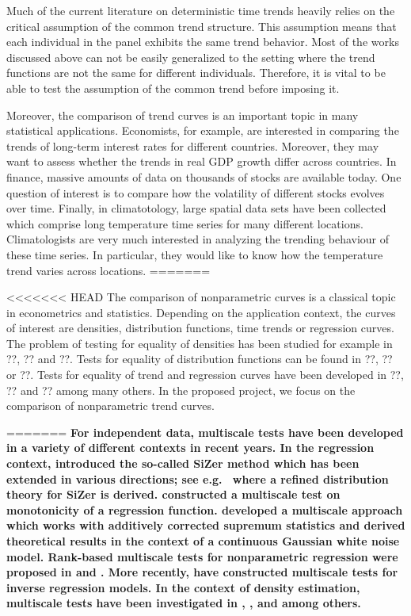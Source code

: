 \documentclass[a4paper,12pt]{article}
\begin{document}
Much of the current literature on deterministic time trends heavily relies on the critical assumption of the common trend structure. This assumption means that each individual in the panel exhibits the same trend behavior. Most of the works discussed above can not be easily generalized to the setting where the trend functions are not the same for different individuals. Therefore, it is vital to be able to test the assumption of the common trend before imposing it. 


Moreover, the comparison of trend curves is an important topic in many statistical applications. Economists, for example, are interested in comparing the trends of long-term interest rates for different countries. Moreover, they may want to assess whether the trends in real GDP growth differ across countries. In finance, massive amounts of data on thousands of stocks are available today. One question of interest is to compare how the volatility of different stocks evolves over time. Finally, in climatotology, large spatial data sets have been collected which comprise long temperature time series for many different locations. Climatologists are very much interested in analyzing the trending behaviour of these time series. In particular, they would like to know how the temperature trend varies across locations. 
=======

<<<<<<< HEAD
The comparison of nonparametric curves is a classical topic in econometrics and statistics. Depending on the application context, the curves of interest are densities, distribution functions, time trends or regression curves. The problem of testing for equality of densities has been studied for example in ??, ?? and ??. Tests for equality of distribution functions can be found in ??, ?? or ??. Tests for equality of trend and regression curves have been developed in ??, ?? and ?? among many others. In the proposed project, we focus on the comparison of nonparametric trend curves.

=======
{\bf For independent data, multiscale tests have been developed in a variety of different contexts in recent years. In the regression context, \cite{ChaudhuriMarron1999,ChaudhuriMarron2000} introduced the so-called SiZer method which has been extended in various directions; see e.g.\ \cite{HannigMarron2006} where a refined distribution theory for SiZer is derived. \cite{HallHeckman2000} constructed a multiscale test on monotonicity of a regression function. \cite{DuembgenSpokoiny2001} developed a multiscale approach which works with additively corrected supremum statistics and derived theoretical results in the context of a continuous Gaussian white noise model. Rank-based multiscale tests for nonparametric regression were proposed in \cite{Duembgen2002} and \cite{Rohde2008}. More recently, \cite{ProkschWernerMunk2018} have constructed multiscale tests for inverse regression models. In the context of density estimation, multiscale tests have been investigated in \cite{DuembgenWalther2008}, \cite{RufibachWalther2010}, \cite{SchmidtHieber2013} and \cite{EckleBissantzDette2017} among others.}
\end{document}
